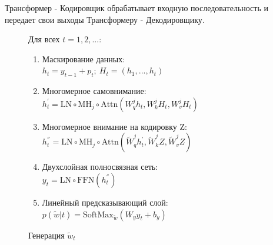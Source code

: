 Трансформер - Кодировщик обрабатывает входную последовательность и передает свои выходы Трансформеру - Декодировщику.

\newpage 

\begin{figure}[H]
    \begin{minipage}{0.7\textwidth}  
        Для всех $t = 1, 2, ...:$
        \begin{enumerate}
            \item Маскирование данных: \\
            $h_{t} = y_{t-1} + p_{t}; \ H_{t} = (h_{1}, ..., h_{t})$
            \item Многомерное самовнимание: \\
            $h_{t}^{'} = \text{LN} \circ \text{MH}_{j} \circ \text{Attn}(W_{q}^{j}h_{t}, W_{k}^{j}H_{t}, W_{v}^{j}H_{t})$
            \item Многомерное внимание на кодировку Z: \\
            $h_{t}^{''} = \text{LN} \circ \text{MH}_{j} \circ \text{Attn}(\tilde{W}_{q}^{j}h_{t}^{'}, \tilde{W}_{k}^{j}Z, \tilde{W}_{v}^{j}Z)$
            \item Двухслойная полносвязная сеть: \\
            $y_{t} = \text{LN} \circ \text{FFN}(h_{t}^{''})$
            \item Линейный предсказывающий слой: \\
            $p(\tilde{w}|t) = \text{SoftMax}_{\tilde{w}}(W_{y}y_{t} + b_{y})$
        \end{enumerate}
        Генерация $\tilde{w}_{t}$
    \end{minipage}
    \centering
    \begin{minipage}{0.25\textwidth}
        \centering

\end{minipage}
\end{figure}
